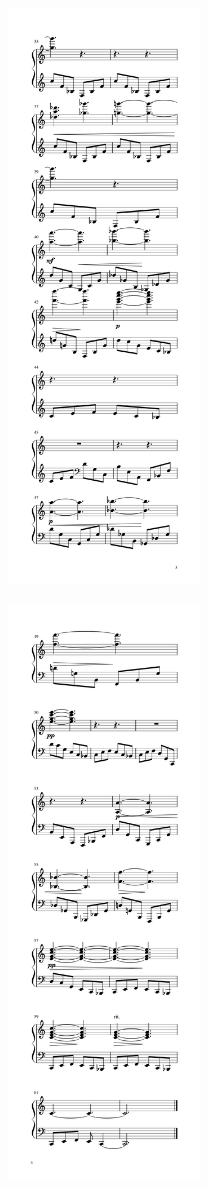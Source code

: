 \begin{paracol}{2}
\begin{rightcolumn*}
\noindent\includegraphics[width=2in]{assets/static/miniatures/4-3.png}

  \begin{flushright}
\noindent\includegraphics[width=2in]{assets/static/miniatures/4-4.png}
\end{flushright}


\end{rightcolumn*}
\end{paracol}
